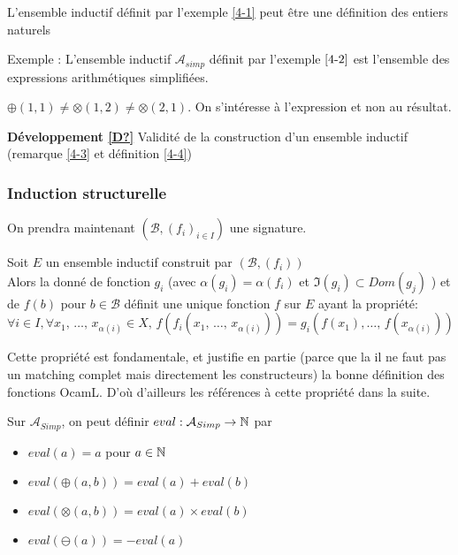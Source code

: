 \begin{example}
	L'ensemble inductif définit par l'exemple \ref{4-1} peut être une définition des entiers naturels \label{4-6}
\end{example}

\begin{example}
	Exemple : L'ensemble inductif $\mathcal A_{simp}$ définit par l'exemple $\ref{4-2}$ est l'ensemble des expressions arithmétiques simplifiées.
\end{example}

\begin{rem}
	$\oplus(1, 1) \neq \otimes(1, 2) \neq \otimes(2, 1)$. On s'intéresse à l'expression et non au résultat.
\end{rem}

\noindent \textbf{Développement \ref{D?}} Validité de la construction d'un ensemble inductif (remarque \ref{4-3} et définition \ref{4-4})

\subsubsection{Induction structurelle}
On prendra maintenant $(\mathcal B, (f_i)_{i \in I})$ une signature.

\begin{proposition}
	\label{4-5}
	Soit $E$ un ensemble inductif construit par $(\mathcal B, (f_i))$\\
	
	Alors la donné de fonction $g_i$ (avec $\alpha(g_i) = \alpha(f_i)$ et $\Im(g_i) \subset Dom(g_j)$ ) et de $f(b)$ pour $b \in \mathcal B$ définit une unique fonction $f$ sur $E$ ayant la propriété:
	$$\forall i \in I, \forall x_1, \, \dots , \, x_{\alpha(i)} \in X, \, f\left(f_i(x_1, \, \dots, \, x_{\alpha(i)})\right) =  g_i\left(f(x_1), \dots, \, f(x_{\alpha(i)})\right)$$
\end{proposition}

\begin{com}
	Cette propriété est fondamentale, et justifie en partie (parce que la il ne faut pas un matching complet mais directement les constructeurs) la bonne définition des fonctions OcamL. D'où d'ailleurs les références à cette propriété dans la suite.
\end{com}


\begin{example}
	Sur $\mathcal A_{Simp}$, on peut définir $eval : \mathcal A_{Simp} \to \mathbb{N}$ par \begin{itemize}
		\item $eval(a) = a$ pour $a \in \mathbb{N}$
		\item $eval(\oplus(a, b)) = eval(a) + eval(b)$
		\item $eval(\otimes(a, b)) = eval(a) \times  eval(b)$
		\item $eval(\ominus(a)) = - eval(a)$
	\end{itemize}
\end{example}

